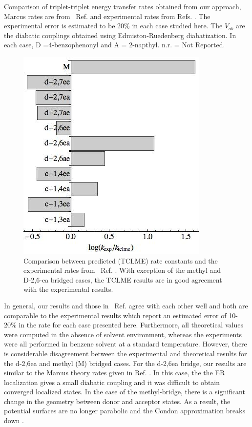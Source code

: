 \begin{table}
\begin{centering}
\par\end{centering}
\caption{Comparison of triplet-triplet energy transfer rates obtained from our  approach,  Marcus rates are
from ~Ref. \cite{subotnik2010predicting}
and experimental rates from Refs. \cite{closs1988determination,closs1989connection}.   The experimental error is estimated to be 20\% in each
case studied here.
The $V_{ab}$ are the diabatic couplings obtained using  Edmiston-Ruedenberg diabatization.
In each case, D =4-benzophenonyl and A = 2-napthyl.  n.r. = Not Reported.
}
\label{summarytable}
\end{table}



\begin{figure}[t]
\includegraphics[width=0.5\columnwidth]{Chapters/chap2/Figure3}
\caption{Comparison between predicted (TCLME) rate constants and the experimental rates from ~Ref. \cite{miller1984intramolecular}.  With exception of
the methyl and D-2,6-ea bridged cases, the TCLME results are in good agreement with the experimental results.  }\label{compare}
\end{figure}


In general, our results and those in ~Ref. \cite{subotnik2010predicting} agree with each other well and both are
comparable to the experimental results which report an estimated error of 10-20\% in the
rate for each case presented here.  Furthermore,  all theoretical values were computed
in the absence of solvent environment, whereas the experiments were all performed in benzene solvent at a standard temperature.
However,  there is considerable disagreement between the experimental and theoretical results for
the d-2,6ea and methyl (M) bridged cases.   For the d-2,6ea bridge,  our results are similar to the
Marcus theory rates given in Ref. \cite{subotnik2010predicting}.  In this case, the
 the ER localization gives a  small diabatic coupling
 and it was  difficult to obtain converged localized states.
In the case of the methyl-bridge,  there is a significant change in the geometry between donor and acceptor states.
As a result,  the potential surfaces are no longer parabolic
and the Condon approximation breaks down \cite{subotnik2010predicting}.









